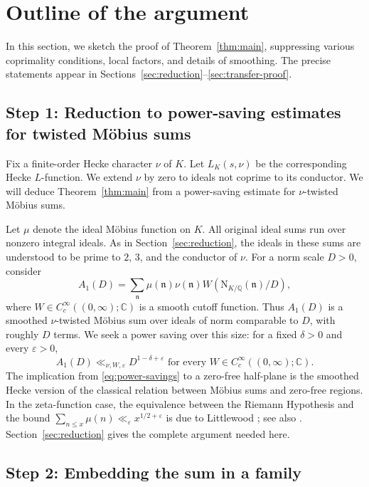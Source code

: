 \documentclass[11pt,a4paper]{article}
\numberwithin{equation}{section}
\numberwithin{figure}{section}
\theoremstyle{definition}
\theoremstyle{remark}
\newcommand{\Q}{\mathbb Q}
\newcommand{\NK}{\mathrm N_{K/\Q}}
\begin{document}
\section{Outline of the argument}\label{sec:outline}

In this section, we sketch the proof of Theorem~\ref{thm:main}, suppressing
various coprimality conditions, local factors, and details of smoothing.
The precise statements appear in Sections~\ref{sec:reduction}--\ref{sec:transfer-proof}.

\subsection{Step 1: Reduction to power-saving estimates for twisted M\"obius sums}


Fix a finite-order Hecke character $\nu$ of $K$. Let $L_K(s, \nu)$ be the corresponding Hecke $L$-function. We extend $\nu$ by zero to ideals not coprime to its conductor. We will deduce Theorem~\ref{thm:main} from a power-saving estimate for $\nu$-twisted M\"obius sums.

Let $\mu$ denote the ideal M\"obius function on $K$. All original ideal sums
run over nonzero integral ideals.
As in Section~\ref{sec:reduction}, the ideals in these sums are understood
to be prime to $2$, $3$, and the conductor of $\nu$. For a norm scale $D>0$, consider
\[
 A_1(D)=\sum_{\mathfrak n}
   \mu(\mathfrak n)\nu(\mathfrak n)
   W(\NK(\mathfrak n)/D),
\]
where $W\in C_c^\infty((0,\infty);\mathbb C)$ is a smooth cutoff function. Thus $A_1(D)$ is a smoothed $\nu$-twisted M\"obius sum over ideals of norm comparable to $D$, with roughly $D$ terms. We seek a power saving over
this size: for a fixed $\delta>0$ and every $\varepsilon>0$,
\begin{equation}\label{eq:power-savings}
A_1(D)\ll_{\nu,W,\varepsilon}D^{1-\delta+\varepsilon} \text{ for every }W\in C_c^\infty((0,\infty);\mathbb C).
\end{equation}
The implication from \eqref{eq:power-savings} to a zero-free half-plane
is the smoothed Hecke version of the classical relation between M\"obius
sums and zero-free regions. In the zeta-function case, the equivalence
between the Riemann Hypothesis and the bound
$\sum_{n\le x}\mu(n)\ll_\varepsilon x^{1/2+\varepsilon}$ is due to
Littlewood \cite{Lit12}; see also \cite[\S1]{MM09}.
Section~\ref{sec:reduction} gives the complete argument needed here.

\subsection{Step 2: Embedding the sum in a family}
\end{document}
